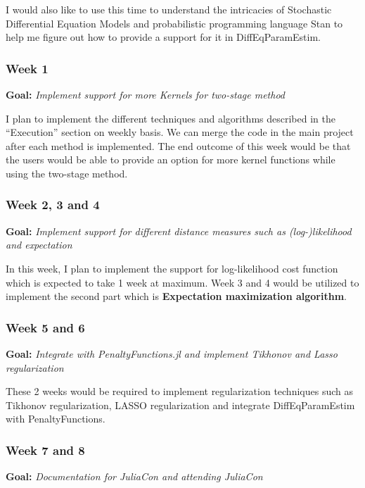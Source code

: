 \documentclass[11pt]{article}
\begin{document}
I would also like to use this time to understand the intricacies of
Stochastic Differential Equation Models and probabilistic programming
language Stan to help me figure out how to provide a support for it in
DiffEqParamEstim.

    \subsubsection{Week 1}\label{week-1}

\textbf{Goal:} \emph{Implement support for more Kernels for two-stage
method}

I plan to implement the different techniques and algorithms described in
the ``Execution'' section on weekly basis. We can merge the code in the
main project after each method is implemented. The end outcome of this
week would be that the users would be able to provide an option for more
kernel functions while using the two-stage method.

    \subsubsection{Week 2, 3 and 4}\label{week-2-3-and-4}

\textbf{Goal:} \emph{Implement support for different distance measures
such as (log-)likelihood and expectation }

In this week, I plan to implement the support for log-likelihood cost
function which is expected to take 1 week at maximum. Week 3 and 4 would
be utilized to implement the second part which is \textbf{Expectation
maximization algorithm}.

    \subsubsection{Week 5 and 6}\label{week-5-and-6}

\textbf{Goal:} \emph{Integrate with PenaltyFunctions.jl and implement
Tikhonov and Lasso regularization}

These 2 weeks would be required to implement regularization techniques
such as Tikhonov regularization, LASSO regularization and integrate
DiffEqParamEstim with PenaltyFunctions.

    \subsubsection{Week 7 and 8}\label{week-7-and-8}

\textbf{Goal:} \emph{Documentation for JuliaCon and attending JuliaCon}
\end{document}

